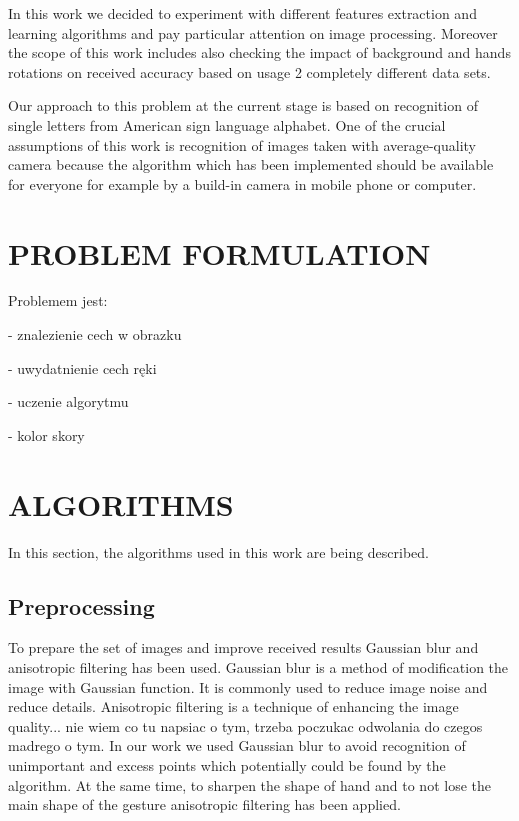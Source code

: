 \documentclass[11pt,a4paper]{article}
\begin{document}
	In this work we decided to experiment with different features extraction and learning algorithms and pay particular attention on image processing. Moreover the scope of this work includes also checking the impact of background and hands rotations on received accuracy based on usage 2 completely different data sets.
	
	Our approach to this problem at the current stage is based on recognition of single letters from American sign language alphabet. One of the crucial assumptions of this work is recognition of images taken with average-quality camera because the algorithm which has been implemented should be available for everyone for example by a build-in camera in mobile phone or computer.
	
	
	
	
	

	

\section{PROBLEM FORMULATION}

Problemem jest:

- znalezienie cech w obrazku

- uwydatnienie cech ręki

- uczenie algorytmu

- kolor skory


\section{ALGORITHMS}

	In this section, the algorithms used in this work are being described.

\subsection{Preprocessing}
	
	To prepare the set of images and improve received results Gaussian blur and anisotropic filtering has been used. Gaussian blur is a method of modification the image with Gaussian function. It is commonly used to reduce image noise and reduce details. Anisotropic filtering is a technique of enhancing the image quality... nie wiem co tu napsiac o tym, trzeba poczukac odwolania do czegos madrego o tym. In our work we used Gaussian blur to avoid recognition of unimportant and excess points which potentially could be found by the algorithm. At the same time, to sharpen the shape of hand and to not lose the main shape of the gesture anisotropic filtering has been applied.
\end{document}
